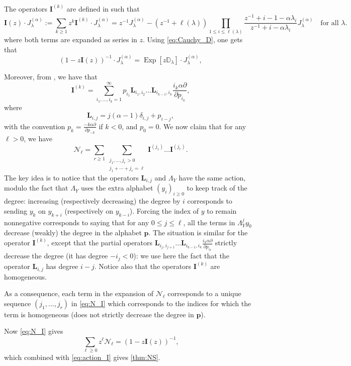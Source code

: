 \documentclass[12pt]{amsart}
\theoremstyle{remark}
\newcommand{\bfp}{\boldsymbol{p}}
\newcommand{\J}{{J}^{(\alpha)}}
\DeclareMathOperator{\Exp}{Exp}
\newcommand{\bD}{\mathbb D}
\newcommand{\N}{\mathcal{N}}
\begin{document}
The operators $\mathbf{I}^{(k)}$ are defined in \cite[Section 6]{NazarovSklyanin2013} such that 
$$\mathbf{I}(z)\cdot \J_\lambda:=\sum_{k\geq 1}z^{k}\mathbf{I}^{(k)}\cdot \J_\lambda=z^{-1}\J_\lambda-(z^{-1}+\ell(\lambda))\prod_{1\leq i\leq \ell(\lambda)}\frac{z^{-1}+i-1-\alpha \lambda_i}{z^{-1}+i-\alpha\lambda_i}\J_\lambda \quad\text{for all $\lambda$.}$$
where both terms are expanded as series in $z$.
Using \cref{eq:Cauchy_D}, one gets that 
\begin{equation}\label{eq:action_I}
 \left(1-z\mathbf{I}(z)\right)^{-1} \cdot  \J_\lambda=\Exp[z\bD_\lambda]\cdot \J_\lambda,
\end{equation}

Moreover, from \cite[Theorem 2]{NazarovSklyanin2013}, we have that
\begin{equation*}
  \mathbf{I}^{(k)}=\sum_{i_1,\dots,i_k=1}^\infty p_{i_1}\mathbf{L}_{i_1,i_2}\dots\mathbf{L}_{i_{k-1},i_{k}}\frac{i_k\alpha\partial }{\partial p_{i_k}},  
\end{equation*}
where 
$$\mathbf{L}_{i,j}=j(\alpha-1)\delta_{i,j}+p_{i-j},$$
with the convention $p_k=\frac{-k\alpha\partial }{\partial p_{-k}}$ if $k<0$, and $p_0=0$.
We now claim that for any $\ell >0$, we have 
\begin{equation}\label{eq:N_I}
  \N_\ell=\sum_{r\ge1}\sum_{\substack{j_1,\dots,j_r>0\\j_1+\cdots +j_r=\ell}}\mathbf{I}^{(j_1)}\dots \mathbf{I}^{(j_r)}.  
\end{equation}
The key idea is to notice that the operators $\mathbf{L}_{i,j}$ and $\Lambda_Y$ have the same action, modulo the fact that $\Lambda_Y$ uses the extra alphabet $(y_i)_{i\geq 0}$ to keep track of the degree: increasing (respectively decreasing) the degree by $i$ corresponds to sending $y_k$ on $y_{k+i}$ (respectively on $y_{k-i}$). Forcing the index of $y$ to remain nonnegative corresponds to saying that for any $0\leq j\leq \ell$, all the terms in $\Lambda_Y^jy_0$ decrease (weakly) the degree in the alphabet $\bfp$. The situation is similar for the operator $\mathbf{I}^{(k)}$, except that the partial operators $\mathbf{L}_{i_j,i_{j+1}}\dots\mathbf{L}_{i_{k-1},i_{k}}\frac{i_k\alpha\partial }{\partial p_{i_k}}$ strictly decrease the degree (it has degree $-i_j<0$): we use here the fact that the operator $\mathbf{L}_{i,j}$ has degree $i-j$. Notice also that the operators $\mathbf{I}^{(k)}$ are homogeneous.

As a consequence, each term in the expansion of $\N_\ell$ corresponds to a unique sequence $(j_1,\dots,j_r)$ in \cref{eq:N_I} which corresponds 
to the indices for which the term is homogeneous (does not strictly decrease the degree in $\bfp$).

Now \cref{eq:N_I} gives
$$\sum_{\ell\geq 0}z^\ell\N_\ell=\left(1-z\mathbf{I}(z)\right)^{-1},$$
which combined with \cref{eq:action_I} gives \cref{thm:NS}.



   
\end{document}
